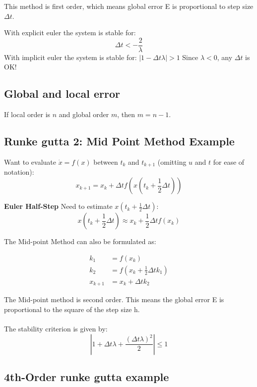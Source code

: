 This method is first order, which means global error E is proportional to step size $\Delta t$. 

With explicit euler the system is stable for: \[\Delta t < - \frac{2}{\lambda}\] \newline
With implicit euler the system is stable for: $\left\lvert1 - \Delta t \lambda \right\rvert > 1$ \newline
Since $\lambda < 0$, any $\Delta t$ is OK!

\subsection{Global and local error}
If local order is $n$ and global order $m$, then $m = n - 1$.

\subsection{Runke gutta 2: Mid Point Method Example }
Want to evaluate \(\dot{x} = f(x)\) between \(t_k\) and \(t_{k+1}\) (omitting \(u\) and \(t\) for ease of notation):
\begin{equation}
x_{k+1} = x_k + \Delta t f\left( x \left( t_k + \frac{1}{2} \Delta t \right) \right)
\end{equation}

\textbf{Euler Half-Step}
Need to estimate \(x \left( t_k + \frac{1}{2} \Delta t \right)\):
\begin{equation}
x \left( t_k + \frac{1}{2} \Delta t \right) \approx x_k + \frac{1}{2} \Delta t f(x_k)
\end{equation}

The Mid-point Method can also be formulated as:

\begin{align}
k_1 &= f(x_k) \\
k_2 &= f\left(x_k + \frac{1}{2} \Delta t k_1\right) \\
x_{k+1} &= x_k + \Delta t k_2
\end{align}

The Mid-point method is second order.  This means the global error E is proportional to the square of the step size h.
\\
\\
The stability criterion is given by:
\begin{equation}
\left| 1 + \Delta t \lambda + \frac{(\Delta t \lambda)^2}{2} \right| \leq 1
\end{equation}

\subsection{4th-Order runke gutta example}

